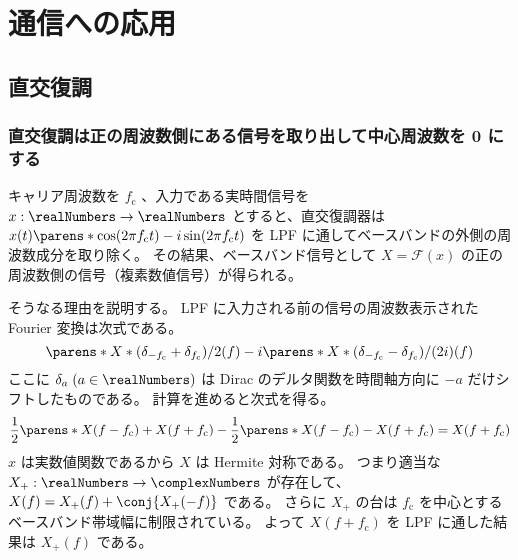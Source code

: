 \chapter{通信への応用}
    \section{直交復調}
        \newcommand{\fc}{f_\text{c}}
        \subsection{直交復調は正の周波数側にある信号を取り出して中心周波数を 0 にする}
            キャリア周波数を $\fc$ 、入力である実時間信号を $x:\realNumbers\to\realNumbers$ とすると、直交復調器は $x(t)\parens*{\cos(2\pi \fc t) - i\sin(2\pi \fc t)}$ を LPF に通してベースバンドの外側の周波数成分を取り除く。
            その結果、ベースバンド信号として $X = \mathcal{F}(x)$ の正の周波数側の信号（複素数値信号）が得られる。
            \par
            そうなる理由を説明する。
            LPF に入力される前の信号の周波数表示された Fourier 変換は次式である。
            \[ \parens*{X*(\delta_{-\fc} + \delta_{\fc})/2}(f) - i\parens*{X*(\delta_{-\fc} - \delta_{\fc})/(2i)}(f) \]
            ここに $\delta_a\;(a\in\realNumbers)$ は Dirac のデルタ関数を時間軸方向に $-a$ だけシフトしたものである。
            計算を進めると次式を得る。
            \[ \frac{1}{2}\parens*{X(f-\fc)+X(f+\fc)} - \frac{1}{2}\parens*{X(f-\fc)-X(f+\fc)} = X(f+\fc) \]
            $x$ は実数値関数であるから $X$ は Hermite 対称である。
            つまり適当な $X_+:\realNumbers\to\complexNumbers$ が存在して、$X(f) = X_+(f) + \conj{X_+(-f)}$ である。
            さらに $X_+$ の台は $\fc$ を中心とするベースバンド帯域幅に制限されている。
            よって $X(f+\fc)$ を LPF に通した結果は $X_+(f)$ である。
